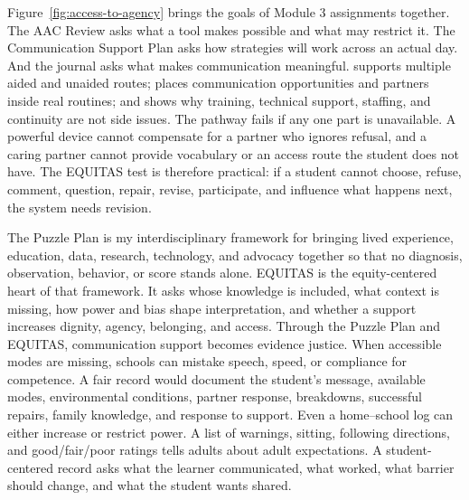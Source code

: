 Figure~\ref{fig:access-to-agency} brings the goals of Module 3 assignments together. The AAC Review asks what a tool makes possible and what may restrict it. The Communication Support Plan asks how strategies will work across an actual day. And the journal asks what makes communication meaningful. \citet{mirenda2015aids} supports multiple aided and unaided routes; \citet{downing2015classroom} places communication opportunities and partners inside real routines; and \citet{norrie2021context} shows why training, technical support, staffing, and continuity are not side issues. The pathway fails if any one part is unavailable. A powerful device cannot compensate for a partner who ignores refusal, and a caring partner cannot provide vocabulary or an access route the student does not have. The EQUITAS test is therefore practical: if a student cannot choose, refuse, comment, question, repair, revise, participate, and influence what happens next, the system needs revision.


The Puzzle Plan is my interdisciplinary framework for bringing lived experience, education, data, research, technology, and advocacy together so that no diagnosis, observation, behavior, or score stands alone. EQUITAS is the equity-centered heart of that framework. It asks whose knowledge is included, what context is missing, how power and bias shape interpretation, and whether a support increases dignity, agency, belonging, and access. Through the Puzzle Plan and EQUITAS, communication support becomes evidence justice. When accessible modes are missing, schools can mistake speech, speed, or compliance for competence. A fair record would document the student's message, available modes, environmental conditions, partner response, breakdowns, successful repairs, family knowledge, and response to support. Even a home--school log can either increase or restrict power. A list of warnings, sitting, following directions, and good/fair/poor ratings tells adults about adult expectations. A student-centered record asks what the learner communicated, what worked, what barrier should change, and what the student wants shared.
